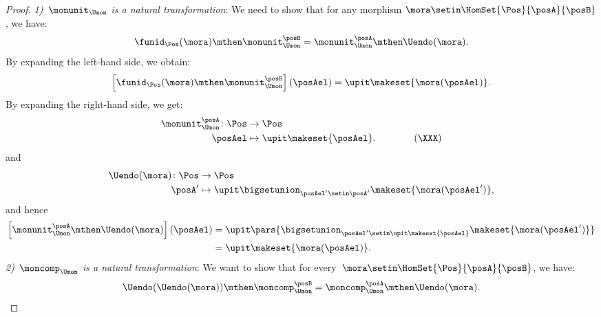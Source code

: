 \begin{proof}
    \emph{1)~$\monunit_{\Umon}$ is a natural transformation}:
    We need to show that for any morphism $\mora\setin \HomSet{\Pos}{\posA}{\posB}$, we have:
    \begin{equation}
        \funid_{\Pos}(\mora)\mthen \monunit_{\Umon}^\posB=\monunit_{\Umon}^\posA\mthen \Uendo(\mora).
    \end{equation}
    By expanding the left-hand side, we obtain:
    \begin{equation}
        \left[\funid_{\Pos}(\mora)\mthen \monunit_{\Umon}^\posB\right](\posAel)=\upit \makeset{\mora(\posAel)}.
    \end{equation}
    By expanding the right-hand side, we get:
    \begin{equation}
        \begin{aligned}
            \monunit_{\Umon}^\posA\colon \Pos & \to \Pos \\
            \posAel                           & \mapsto \upit \makeset{\posAel}.
            \qquad \qquad (\XXX)
        \end{aligned}
    \end{equation}
    and
    \begin{equation}
        \begin{aligned}
            \Uendo(\mora)\colon \Pos & \to \Pos \\
            \posA'                   & \mapsto \upit \bigsetunion_{\posAel'\setin \posA'}\makeset{\mora(\posAel')},
        \end{aligned}
    \end{equation}
    and hence
    \begin{equation}
        \begin{aligned}
            \left[\monunit_{\Umon}^\posA\mthen \Uendo(\mora)\right](\posAel) & =\upit \pars{ \bigsetunion_{\posAel'\setin \upit \makeset{\posAel}} \makeset{\mora(\posAel')}} \\
                                                                             & =\upit \makeset{\mora(\posAel)}.
        \end{aligned}
    \end{equation}
    \emph{2)~$\moncomp_{\Umon}$ is a natural transformation}:
    We want to show that for every~$\mora\setin \HomSet{\Pos}{\posA}{\posB}$, we have:
    \begin{equation}
        \Uendo(\Uendo(\mora))\mthen \moncomp_{\Umon}^{\posB}=\moncomp_{\Umon}^\posA \mthen \Uendo(\mora).

\end{equation}
\end{proof}
